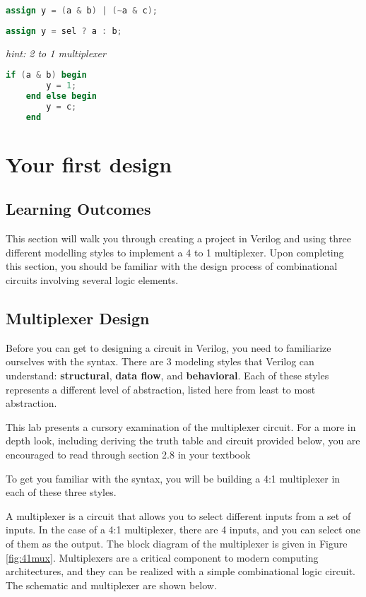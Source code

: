 \documentclass[12pt]{journal}
\begin{document}
\begin{lstlisting}[language=Verilog]
    assign y = (a & b) | (~a & c);
\end{lstlisting}
\vspace{3\textheight}
\begin{lstlisting}[language=Verilog]
    assign y = sel ? a : b;
\end{lstlisting}
\textit{\small{hint: 2 to 1 multiplexer}}
\vspace{16em}
\begin{lstlisting}[language=Verilog]  
    if (a & b) begin
        y = 1;
    end else begin
        y = c;
    end
\end{lstlisting}
\newpage
\section{Your first design}
\subsection{Learning Outcomes}
This section will walk you through creating a project in Verilog and using three different modelling styles to implement a 4 to 1 multiplexer. Upon completing this section, you should be familiar with the design process of combinational circuits involving several logic elements.


\subsection{Multiplexer Design}

\begin{paracol}{2}
\switchcolumn[0]    
Before you can get to designing a circuit in Verilog, you need to familiarize ourselves with the syntax. There are 3 modeling styles that Verilog can understand: \textbf{structural}, \textbf{data flow}, and \textbf{behavioral}. Each of these styles represents a different level of abstraction, listed here from least to most abstraction. 
\switchcolumn[1]
\begin{extra}[frametitle={Textbook Reading: Multiplexers}]
    This lab presents a cursory examination of the multiplexer circuit. For a more in depth look, including deriving the truth table and circuit provided below, you are encouraged to read through section 2.8 in your textbook
\end{extra}
\switchcolumn[0]
To get you familiar with the syntax, you will be building a 4:1 multiplexer in each of these three styles.
\end{paracol}
A multiplexer is a circuit that allows you to select different inputs from a set of inputs. In the case of a 4:1 multiplexer, there are 4 inputs, and you can select one of them as the output. 
The block diagram of the multiplexer is given in Figure \ref{fig:41mux}. Multiplexers are a critical component to modern computing architectures, and they can be realized with a simple combinational logic circuit. The schematic and multiplexer are shown below.
\clearpage
\end{document}
